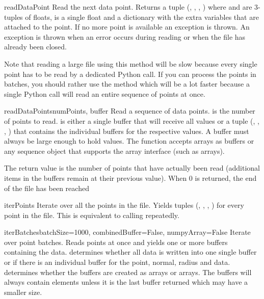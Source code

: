 \begin{methoddesc}{readDataPoint}{}
Read the next data point. Returns a tuple (, ,
, ) where  and  are 3-tuples of
floats,  is a single float and  a dictionary with the
extra variables that are attached to the point. If no more point is available
an  exception is thrown.
An  exception is thrown when an error occurs during reading
or when the file has already been closed.

Note that reading a large file using this method will be slow because every
single point has to be read by a dedicated Python call. If you can process
the points in batches, you should rather use the 
method which will be a lot faster because a single Python call will read
an entire sequence of points at once.
\end{methoddesc}

\begin{methoddesc}{readDataPoints}{numPoints, buffer}
Read a sequence of data points.
 is the number of points to read.  is either a single
buffer that will receive all values or a tuple (, ,
, ) that contains the individual buffers for the
respective values. A buffer must always be large enough to hold 
values. The function accepts  arrays as buffers or any sequence
object that supports the array interface (such as  arrays).
        
The return value is the number of points that have actually been read (additional
items in the buffers remain at their previous value). When 0 is returned, the
end of the file has been reached
\end{methoddesc}

\begin{methoddesc}{iterPoints}{}
Iterate over all the points in the file.
Yields tuples (, , , ) for every
point in the file. This is equivalent to calling 
repeatedly.
\end{methoddesc}

\begin{methoddesc}{iterBatches}{batchSize=1000, combinedBuffer=False,
numpyArray=False}
Iterate over point batches.
Reads  points at once and yields one or more buffers containing
the data.  determines whether all data is written into one
single buffer or if there is an individual buffer for the point, normal, radius
and data.  determines whether the buffers are created as
 arrays or  arrays. The buffers will always contain
 elements unless it is the last buffer returned which may
have a smaller size.
\end{methoddesc}



